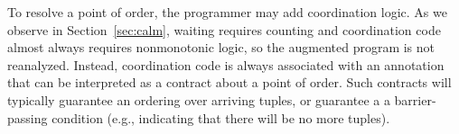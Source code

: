 To resolve a point of order, the programmer may add coordination logic.
As we observe in Section~\ref{sec:calm}, waiting requires counting and coordination code almost always 
requires nonmonotonic logic, so the augmented program is not reanalyzed.
Instead, coordination code is always associated with an annotation that can
be interpreted as a contract about a point of order.  Such contracts will
typically guarantee an ordering over arriving tuples, or guarantee a 
a barrier-passing condition (e.g., indicating that there will be no more tuples).

